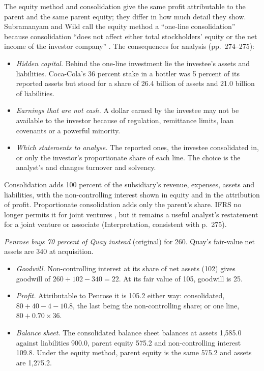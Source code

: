 \begin{qfmethod}\label{meth:consolidation-ratio-effects}
 The equity method and consolidation give the same profit attributable to the parent and the same parent equity; they differ in how much detail they show. Subramanyam and Wild call the equity method a ``one-line consolidation'' because consolidation ``does not affect either total stockholders' equity or the net income of the investor company'' \citep[p.~273]{financial-statement-analysis-2009}. The consequences for analysis (pp.~274--275):
\begin{itemize}
\item \emph{Hidden capital.} Behind the one-line investment lie the investee's assets and liabilities. Coca-Cola's 36 percent stake in a bottler was 5 percent of its reported assets but stood for a share of 26.4 billion of assets and 21.0 billion of liabilities.
\item \emph{Earnings that are not cash.} A dollar earned by the investee may not be available to the investor because of regulation, remittance limits, loan covenants or a powerful minority.
\item \emph{Which statements to analyse.} The reported ones, the investee consolidated in, or only the investor's proportionate share of each line. The choice is the analyst's and changes turnover and solvency.
\end{itemize}
Consolidation adds 100 percent of the subsidiary's revenue, expenses, assets and liabilities, with the non-controlling interest shown in equity and in the attribution of profit. Proportionate consolidation adds only the parent's share. IFRS no longer permits it for joint ventures \citep[para.~24]{eu-2023-1803-ifrs11}, but it remains a useful analyst's restatement for a joint venture or associate (Interpretation, consistent with p.~275).

 \emph{Penrose buys 70 percent of Quay instead} (original) for 260. Quay's fair-value net assets are 340 at acquisition.
\begin{itemize}
\item \emph{Goodwill.} Non-controlling interest at its share of net assets (102) gives goodwill of $260+102-340=22$. At its fair value of 105, goodwill is 25.
\item \emph{Profit.} Attributable to Penrose it is 105.2 either way: consolidated, $80+40-4-10.8$, the last being the non-controlling share; or one line, $80+0.70\times36$.
\item \emph{Balance sheet.} The consolidated balance sheet balances at assets 1,585.0 against liabilities 900.0, parent equity 575.2 and non-controlling interest 109.8. Under the equity method, parent equity is the same 575.2 and assets are 1,275.2.
\end{itemize}


\end{qfmethod}
